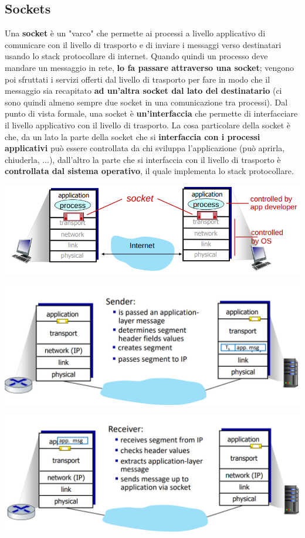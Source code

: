 \documentclass[12pt]{article}
\begin{document}
\subsection{Sockets}
Una \textbf{socket} è un "varco" che permette ai processi a livello applicativo di comunicare con il livello di trasporto e di inviare i messaggi verso destinatari
usando lo stack protocollare di internet. Quando quindi un processo deve mandare un messaggio in rete, \textbf{lo fa passare attraverso una socket}; vengono poi sfruttati i servizi
offerti dal livello di trasporto per fare in modo che il messaggio sia recapitato \textbf{ad un'altra socket dal lato del destinatario} (ci sono quindi almeno sempre due socket in una comunicazione tra processi).
Dal punto di vista formale, una socket è \textbf{un'interfaccia} che permette di interfacciare il livello applicativo con il livello di trasporto. La cosa particolare della socket è che, da un lato la parte della socket
che si \textbf{interfaccia con i processi applicativi} può essere controllata da chi sviluppa l'applicazione (può aprirla, chiuderla, ...), dall'altro la parte che si interfaccia con il livello di trasporto è \textbf{controllata dal sistema operativo},
il quale implementa lo stack protocollare.
\begin{center}
    \includegraphics[width = 1\linewidth]{Images/36.png}
\end{center}
\begin{center}
    \includegraphics[width = 1\linewidth]{Images/37.png}
\end{center}
\begin{center}
    \includegraphics[width = 1\linewidth]{Images/38.png}
\end{center}
\end{document}
